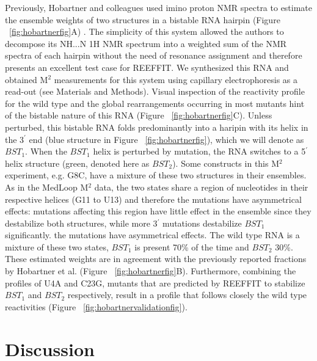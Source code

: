 \documentclass[12pt]{article}
\begin{document}
Previously, Hobartner and colleagues used imino proton NMR spectra to estimate the ensemble weights of two structures in a bistable RNA hairpin (Figure ~\ref{fig:hobartnerfig}A) \cite{Hobartner2003}. 
The simplicity of this system allowed the authors to decompose its NH...N 1H NMR spectrum into a weighted sum of the NMR spectra of each hairpin without the need of resonance assignment and therefore presents an excellent test case for REEFFIT. 
We synthesized this RNA and obtained M$^2$ measurements for this system using capillary electrophoresis as a read-out (see Materials and Methods). 
Visual inspection of the reactivity profile for the wild type and the global rearrangements occurring in most mutants hint of the bistable nature of this RNA (Figure ~\ref{fig:hobartnerfig}C). 
Unless perturbed, this bistable RNA folds predominantly into a haripin with its helix in the 3$^{\prime}$ end (blue structure in Figure ~\ref{fig:hobartnerfig}), which we will denote as $BST_1$. When the $BST_1$ helix is perturbed by mutation, the RNA switches to a 5$^{\prime}$ helix structure (green, denoted here as $BST_2$). 
Some constructs in this M$^2$ experiment, e.g. G8C, have a mixture of these two structures in their ensembles. 
As in the MedLoop M$^2$ data, the two states share a region of nucleotides in their respective helices (G11 to U13) and therefore the mutations have asymmetrical effects: mutations affecting this region have little effect in the ensemble since they destabilize both structures, while more 3$^{\prime}$ mutations destabilize $BST_1$ significantly. the mutations have asymmetrical effects. 
The wild type RNA is a mixture of these two states, $BST_1$ is present 70\% of the time and $BST_2$ 30\%. 
These estimated weights are in agreement with the previously reported fractions by Hobartner et al. (Figure ~\ref{fig:hobartnerfig}B). 
Furthermore, combining the profiles of U4A and C23G, mutants that are predicted by REEFFIT to stabilize $BST_1$ and $BST_2$ respectively, result in a profile that follows closely the wild type reactivities (Figure ~\ref{fig:hobartnervalidationfig}).

\section{Discussion}
\end{document}
